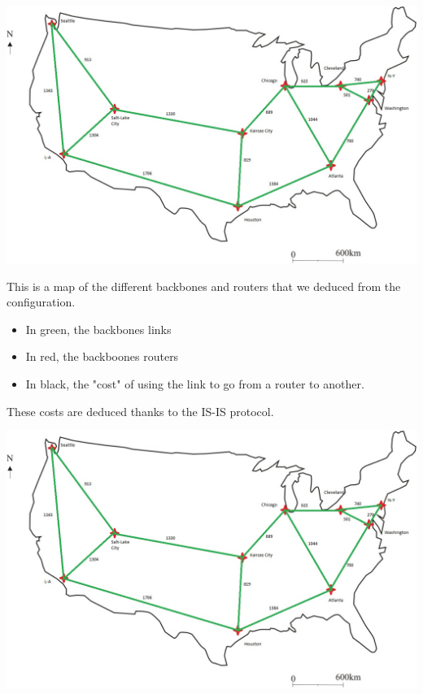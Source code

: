 \documentclass[usenames,dvipsnames]{beamer}
\begin{document}
\begin{frame}{\insertsection}
\begin{center} \includegraphics[scale=0.4]{map_ISIS.jpg} \end{center}
This is a map of the different backbones and routers that we deduced from the configuration.
\begin{itemize}
\item In green, the backbones links
\item In red, the backboones routers
\item In black, the "cost" of using the link to go from a router to another.
\end{itemize}
These costs are deduced thanks to the IS-IS protocol.

\end{frame}

\begin{frame}{\insertsection}
\begin{center} \includegraphics[width=\textwidth]{map_ISIS.jpg} \end{center}
\end{frame}
\end{document}
